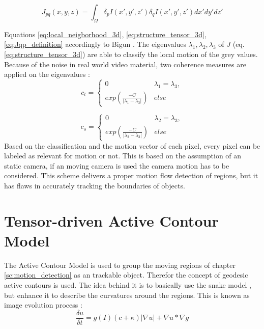 \documentclass[]{article}
\begin{document}
	\begin{equation}
		J_{pq}(x,y,z) = \int_\Omega\delta_p I(x',y',z') \delta_q I(x',y',z') dx' dy' dz'
		\label{eq:Jqp_definition}
	\end{equation}
	
Equations \ref{eq:local_neigborhood_3d}, \ref{eq:structure_tensor_3d}, \ref{eq:Jqp_definition} accordingly to Bigun \cite{bigun1991multidimensional}.
The eigenvalues $\lambda_{1}, \lambda_{2}, \lambda_{3}$ of $J$ (eq. \ref{eq:structure_tensor_3d}) are able to classify the local motion of the grey values. 
Because of the noise in real world video material, two coherence measures are applied on the eigenvalues \cite{kuhne2001tensor}: 
	\begin{equation}
		c_t = 
		\begin{cases}
			0 & \lambda_1 = \lambda_3, \\
			exp(\frac{-C}{|\lambda_1 - \lambda_3|}) & else
		\end{cases}
	\end{equation}

	\begin{equation}
		c_s = 
		\begin{cases}
			0 & \lambda_2 = \lambda_3, \\
			exp(\frac{-C}{|\lambda_2 - \lambda_3|}) & else
		\end{cases}
	\end{equation}
Based on the classification and the motion vector of each pixel, every pixel can be labeled as relevant for motion or not. This is based on the assumption of an static camera, if an moving camera is used the camera motion has to be considered.
This scheme delivers a proper motion flow detection of regions, but it has flaws in accurately tracking the boundaries of objects. 
	

\section{Tensor-driven Active Contour Model}
\label{sc:active_contour_model}
The Active Contour Model is used to group the moving regions of chapter \ref{sc:motion_detection} as an trackable object. Therefor the concept of geodesic active contours \cite{caselles1997geodesic} is used. The idea behind it is to basically use the snake model \cite{caselles1997geodesic}, but enhance it to describe the curvatures around the regions. This is known as image evolution process \cite{kuhne2001tensor}: 
	\begin{equation}
		\frac{\delta{u}}{\delta{t}} = g(I)(c+\kappa)|\nabla{u}|+\nabla{u}*\nabla{g}
		\label{eq:image_evolution}
	\end{equation}
	
\end{document}
